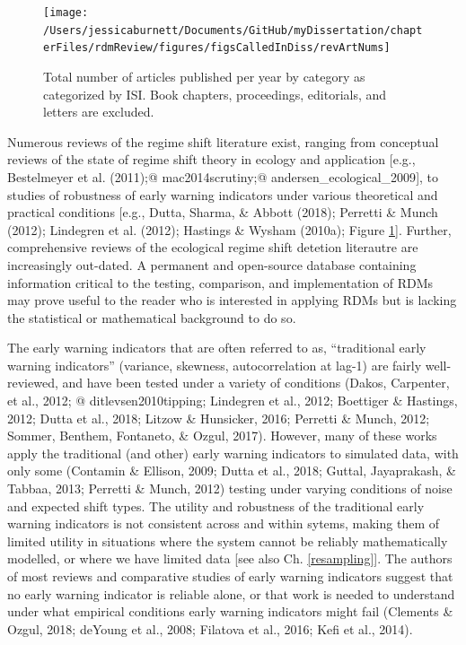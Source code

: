 \documentclass[12pt,twoside,openany]{reedthesis}
\begin{document}
\begin{figure}
\texttt{[image: /Users/jessicaburnett/Documents/GitHub/myDissertation/chapterFiles/rdmReview/figures/figsCalledInDiss/revArtNums]} \caption{Total number of articles published per year by category as categorized by ISI. Book chapters, proceedings, editorials, and letters are excluded.}\label{fig:revArtNums}
\end{figure}
Numerous reviews of the regime shift literature exist, ranging from conceptual reviews of the state of regime shift theory in ecology and application {[}e.g., Bestelmeyer et al. (2011);@ mac2014scrutiny;@ andersen\_ecological\_2009{]}, to studies of robustness of early warning indicators under various theoretical and practical conditions {[}e.g., Dutta, Sharma, \& Abbott (2018); Perretti \& Munch (2012); Lindegren et al. (2012); Hastings \& Wysham (2010a); Figure \ref{fig:revArtNums}{]}. Further, comprehensive reviews of the ecological regime shift detetion literautre are increasingly out-dated. A permanent and open-source database containing information critical to the testing, comparison, and implementation of RDMs may prove useful to the reader who is interested in applying RDMs but is lacking the statistical or mathematical background to do so.

The early warning indicators that are often referred to as, ``traditional early warning indicators'' (variance, skewness, autocorrelation at lag-1) are fairly well-reviewed, and have been tested under a variety of conditions (Dakos, Carpenter, et al., 2012; @ ditlevsen2010tipping; Lindegren et al., 2012; Boettiger \& Hastings, 2012; Dutta et al., 2018; Litzow \& Hunsicker, 2016; Perretti \& Munch, 2012; Sommer, Benthem, Fontaneto, \& Ozgul, 2017). However, many of these works apply the traditional (and other) early warning indicators to simulated data, with only some (Contamin \& Ellison, 2009; Dutta et al., 2018; Guttal, Jayaprakash, \& Tabbaa, 2013; Perretti \& Munch, 2012) testing under varying conditions of noise and expected shift types. The utility and robustness of the traditional early warning indicators is not consistent across and within sytems, making them of limited utility in situations where the system cannot be reliably mathematically modelled, or where we have limited data {[}see also Ch. \ref{resampling}{]}. The authors of most reviews and comparative studies of early warning indicators suggest that no early warning indicator is reliable alone, or that work is needed to understand under what empirical conditions early warning indicators might fail (Clements \& Ozgul, 2018; deYoung et al., 2008; Filatova et al., 2016; Kefi et al., 2014).
\end{document}
